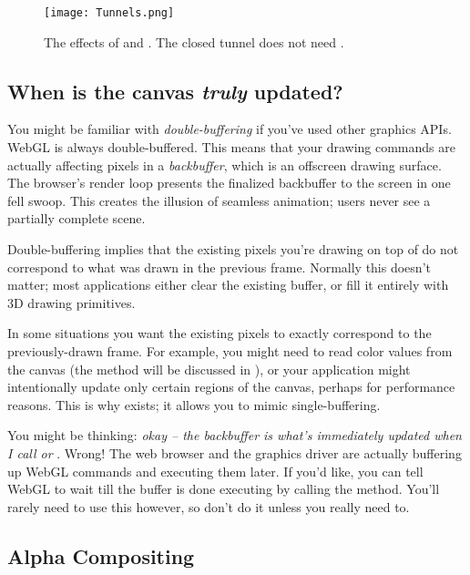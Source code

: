 \begin{figure}[htb]\centering
  \texttt{[image: Tunnels.png]}
  \caption{The effects of  and .  The closed tunnel does not need .}
  \label{fig:Tunnel}
\end{figure}

\subsection{When is the canvas \emph{truly} updated?}
\label{sec:doublebuffer}

You might be familiar with  \emph{double-buffering} if you've used other graphics APIs.  WebGL is always double-buffered.  This means that your drawing commands are actually affecting pixels in a  \emph{backbuffer}, which is an offscreen drawing surface.  The browser's render loop presents the finalized backbuffer to the screen in one fell swoop.  This creates the illusion of seamless animation; users never see a partially complete scene.

Double-buffering implies that the existing pixels you're drawing on top of do not correspond to what was drawn in the previous frame.  Normally this doesn't matter; most applications either clear the existing buffer, or fill it entirely with 3D drawing primitives.

In some situations you want the existing pixels to exactly correspond to the previously-drawn frame.  For example, you might need to read color values from the canvas (the   method will be discussed in ), or your application might intentionally update only certain regions of the canvas, perhaps for performance reasons.  This is why  exists; it allows you to mimic  single-buffering.

You might be thinking: \emph{okay -- the backbuffer is what's immediately updated when I call  or }.  Wrong!  The web browser and the graphics driver are actually buffering up WebGL commands and executing them later.  If you'd like, you can tell WebGL to wait till the buffer is done executing by calling the   method.  You'll rarely need to use this however, so don't do it unless you really need to.

\subsection{Alpha Compositing}

